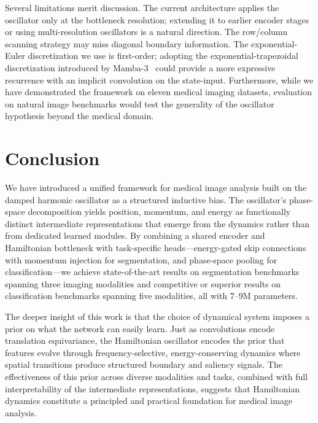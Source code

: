 \documentclass[11pt]{article}
\begin{document}
Several limitations merit discussion. The current architecture applies the oscillator only at the bottleneck resolution; extending it to earlier encoder stages or using multi-resolution oscillators is a natural direction. The row/column scanning strategy may miss diagonal boundary information. The exponential-Euler discretization we use is first-order; adopting the exponential-trapezoidal discretization introduced by Mamba-3~\cite{mamba3} could provide a more expressive recurrence with an implicit convolution on the state-input. Furthermore, while we have demonstrated the framework on eleven medical imaging datasets, evaluation on natural image benchmarks would test the generality of the oscillator hypothesis beyond the medical domain.


\section{Conclusion}
\label{sec:conclusion}

We have introduced a unified framework for medical image analysis built on the damped harmonic oscillator as a structured inductive bias. The oscillator's phase-space decomposition yields position, momentum, and energy as functionally distinct intermediate representations that emerge from the dynamics rather than from dedicated learned modules. By combining a shared encoder and Hamiltonian bottleneck with task-specific heads---energy-gated skip connections with momentum injection for segmentation, and phase-space pooling for classification---we achieve state-of-the-art results on segmentation benchmarks spanning three imaging modalities and competitive or superior results on classification benchmarks spanning five modalities, all with 7--9M parameters.

The deeper insight of this work is that the choice of dynamical system imposes a prior on what the network can easily learn. Just as convolutions encode translation equivariance, the Hamiltonian oscillator encodes the prior that features evolve through frequency-selective, energy-conserving dynamics where spatial transitions produce structured boundary and saliency signals. The effectiveness of this prior across diverse modalities and tasks, combined with full interpretability of the intermediate representations, suggests that Hamiltonian dynamics constitute a principled and practical foundation for medical image analysis.




\end{document}
